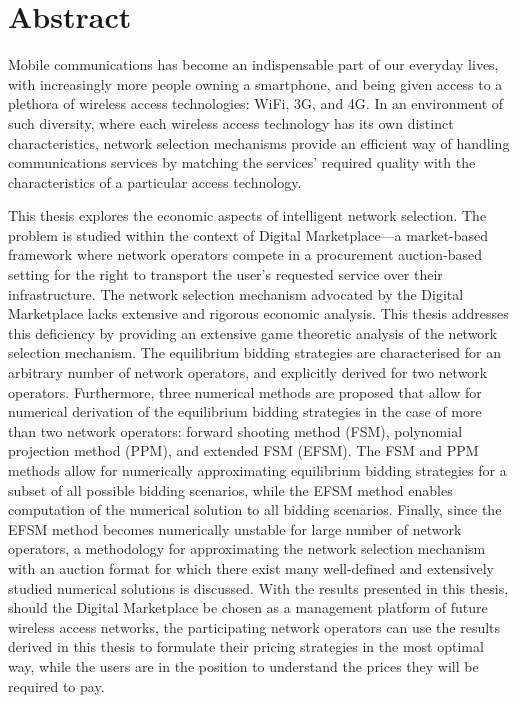 \chapter*{Abstract} %
\label{cha:abstract}
\mtcaddchapter[Abstract]

Mobile communications has become an indispensable part of our everyday lives, with increasingly more people owning a smartphone, and being given access to a plethora of wireless access technologies: WiFi, 3G, and 4G. In an environment of such diversity, where each wireless access technology has its own distinct characteristics, network selection mechanisms provide an efficient way of handling communications services by matching the services' required quality with the characteristics of a particular access technology.

This thesis explores the economic aspects of intelligent network selection. The problem is studied within the context of Digital Marketplace---a market-based framework where network operators compete in a procurement auction-based setting for the right to transport the user's requested service over their infrastructure. The network selection mechanism advocated by the Digital Marketplace lacks extensive and rigorous economic analysis. This thesis addresses this deficiency by providing an extensive game theoretic analysis of the network selection mechanism. The equilibrium bidding strategies are characterised for an arbitrary number of network operators, and explicitly derived for two network operators. Furthermore, three numerical methods are proposed that allow for numerical derivation of the equilibrium bidding strategies in the case of more than two network operators: forward shooting method (FSM), polynomial projection method (PPM), and extended FSM (EFSM). The FSM and PPM methods allow for numerically approximating equilibrium bidding strategies for a subset of all possible bidding scenarios, while the EFSM method enables computation of the numerical solution to all bidding scenarios. Finally, since the EFSM method becomes numerically unstable for large number of network operators, a methodology for approximating the network selection mechanism with an auction format for which there exist many well-defined and extensively studied numerical solutions is discussed. With the results presented in this thesis, should the Digital Marketplace be chosen as a management platform of future wireless access networks, the participating network operators can use the results derived in this thesis to formulate their pricing strategies in the most optimal way, while the users are in the position to understand the prices they will be required to pay.
